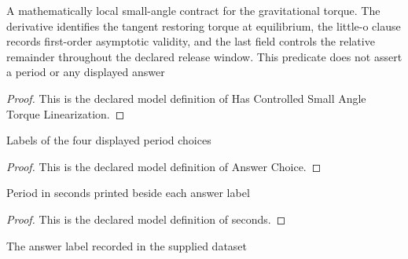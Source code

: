\begin{definition}
  \label{def:physics:phyx-mini-0264:phyxminiproblems-problemphyxmini0264-hascontrolledsmallangletorquelinearization}
  A mathematically local small-angle contract for the gravitational torque. The derivative identifies the tangent restoring torque at equilibrium, the little-o clause records first-order asymptotic validity, and the last field controls the relative remainder throughout the declared release window. This predicate does not assert a period or any displayed answer
\end{definition}
\begin{proof}
  This is the declared model definition of Has Controlled Small Angle Torque Linearization.
\end{proof}
\begin{definition}
  \label{def:physics:phyx-mini-0264:phyxminiproblems-problemphyxmini0264-answerchoice}
  Labels of the four displayed period choices
\end{definition}
\begin{proof}
  This is the declared model definition of Answer Choice.
\end{proof}
\begin{definition}[seconds]
  \label{def:physics:phyx-mini-0264:phyxminiproblems-problemphyxmini0264-answerchoice-seconds}
  Period in seconds printed beside each answer label
\end{definition}
\begin{proof}
  This is the declared model definition of seconds.
\end{proof}
\begin{definition}
  \label{def:physics:phyx-mini-0264:phyxminiproblems-problemphyxmini0264-recordedanswerchoice}
  The answer label recorded in the supplied dataset
\end{definition}
